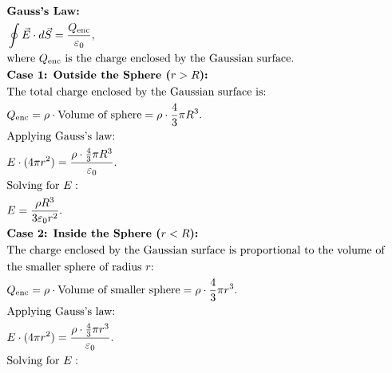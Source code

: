 \documentclass[12pt]{article}
\begin{document}
\begin{correctionbox}
	\begin{align*}
		 & \textbf{Gauss's Law:}                                                                         \\
		 & \oint \vec{E} \cdot d\vec{S} = \frac{Q_{\text{enc}}}{\varepsilon_0},                          \\
		 & \text{where } Q_{\text{enc}} \text{ is the charge enclosed by the Gaussian surface.}
		\\
		 & \textbf{Case 1: Outside the Sphere ($ r > R $):}                                              \\
		 & \text{The total charge enclosed by the Gaussian surface is:}                                  \\
		 & Q_{\text{enc}} = \rho \cdot \text{Volume of sphere} = \rho \cdot \frac{4}{3} \pi R^3.         \\
		 & \text{Applying Gauss's law:}                                                                  \\
		 & E \cdot (4 \pi r^2) = \frac{\rho \cdot \frac{4}{3} \pi R^3}{\varepsilon_0}.                   \\
		 & \text{Solving for } E:                                                                        \\
		 & E = \frac{\rho R^3}{3 \varepsilon_0 r^2}.
		\\
		 & \textbf{Case 2: Inside the Sphere ($ r < R $):}                                               \\
		 & \text{The charge enclosed by the Gaussian surface is proportional to the volume of }          \\
		 & \text{the smaller sphere of radius $ r $:}                                                    \\
		 & Q_{\text{enc}} = \rho \cdot \text{Volume of smaller sphere} = \rho \cdot \frac{4}{3} \pi r^3. \\
		 & \text{Applying Gauss's law:}                                                                  \\
		 & E \cdot (4 \pi r^2) = \frac{\rho \cdot \frac{4}{3} \pi r^3}{\varepsilon_0}.                   \\
		 & \text{Solving for } E:                                                                        \\
	\end{align*}
\end{correctionbox}
\end{document}
